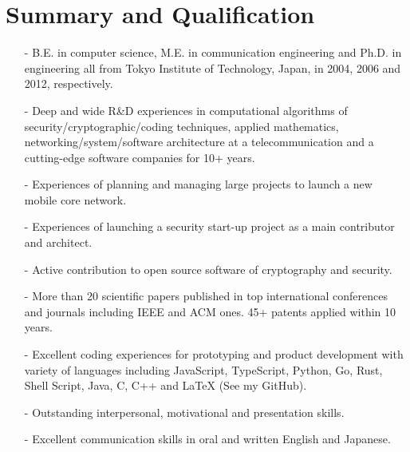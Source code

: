 \section*{Summary and Qualification}
\begin{itemize}
 \item[-] B.E. in computer science, M.E. in communication engineering and Ph.D. in engineering all from Tokyo Institute of Technology, Japan, in 2004, 2006 and 2012, respectively.
 \item[-] Deep and wide R\&D experiences in computational algorithms of security/cryptographic/coding techniques, applied mathematics, networking/system/software architecture at a telecommunication and a cutting-edge software companies for 10+ years.
 \item[-] Experiences of planning and managing large projects to launch a new mobile core network.
 \item[-] Experiences of launching a security start-up project as a main contributor and architect.
 \item[-] Active contribution to open source software of cryptography and security.
 \item[-] More than 20 scientific papers published in top international conferences and journals including IEEE and ACM ones. 45+ patents applied within 10 years.
 \item[-] Excellent coding experiences for prototyping and product development with variety of languages including JavaScript, TypeScript, Python, Go, Rust, Shell Script, Java, C, C++ and LaTeX (See my GitHub).
 \item[-] Outstanding interpersonal, motivational and presentation skills.
 \item[-] Excellent communication skills in oral and written English and Japanese.
\end{itemize}
